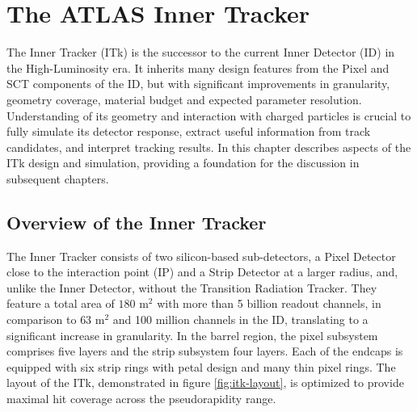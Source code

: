 
\chapter{The ATLAS Inner Tracker}
\label{chap:itk}
The Inner Tracker (ITk) is the successor to the current Inner Detector (ID) in the High-Luminosity era.
It inherits many design features from the Pixel and SCT components of the ID, but with significant improvements in granularity, geometry coverage, material budget and expected parameter resolution. 
Understanding of its geometry and interaction with charged particles is crucial to fully simulate its detector response, extract useful information from track candidates, and interpret tracking results.
In this chapter describes aspects of the ITk design and simulation, providing a foundation for the discussion in subsequent chapters. 

\section{Overview of the Inner Tracker}
\label{sect:itk-overview}

The Inner Tracker consists of two silicon-based sub-detectors, a Pixel Detector close to the interaction point (IP) and a Strip Detector at a larger radius, and, unlike the Inner Detector, without the Transition Radiation Tracker. 
They feature a total area of $180$ $\mathrm{m}^2$ with more than 5 billion readout channels, in comparison to $63$ $\mathrm{m}^2$ and 100 million channels in the ID, translating to a significant increase in granularity. 
In the barrel region, the pixel subsystem comprises five layers and the strip subsystem four layers.
Each of the endcaps is equipped with six strip rings with petal design and many thin pixel rings. 
The layout of the ITk, demonstrated in figure \ref{fig:itk-layout}, is optimized to provide maximal hit coverage across the pseudorapidity range. 


